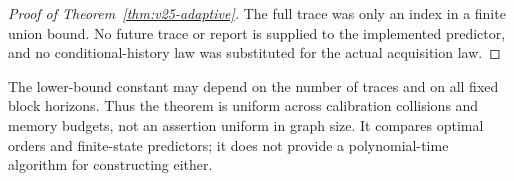 \begin{proof}[Proof of Theorem~\ref{thm:v25-adaptive}]
The full trace was only an index in a finite union bound. No future
trace or report is supplied to the implemented predictor, and no
conditional-history law was substituted for the actual acquisition law.
\end{proof}

The lower-bound constant may depend on the number of traces and on all
fixed block horizons. Thus the theorem is uniform across calibration
collisions and memory budgets, not an assertion uniform in graph size.
It compares optimal orders and finite-state predictors; it does not
provide a polynomial-time algorithm for constructing either.
